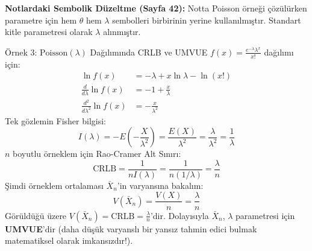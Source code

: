 \documentclass[12pt,a4paper]{article}
\begin{document}
\begin{uyari}
\textbf{Notlardaki Sembolik Düzeltme (Sayfa 42):}
Notta Poisson örneği çözülürken parametre için hem $\theta$ hem $\lambda$ sembolleri birbirinin yerine kullanılmıştır. Standart kitle parametresi olarak $\lambda$ alınmıştır.
\end{uyari}

\begin{ornek}{Örnek 3: $\text{Poisson}(\lambda)$ Dağılımında CRLB ve UMVUE}
$f(x) = \frac{e^{-\lambda}\lambda^x}{x!}$ dağılımı için:
\begin{align}
    \ln f(x) &= -\lambda + x \ln\lambda - \ln(x!) \\
    \frac{d}{d\lambda} \ln f(x) &= -1 + \frac{x}{\lambda} \\
    \frac{d^2}{d\lambda^2} \ln f(x) &= -\frac{x}{\lambda^2}
\end{align}
Tek gözlemin Fisher bilgisi:
\begin{equation}
    I(\lambda) = -E\left( -\frac{X}{\lambda^2} \right) = \frac{E(X)}{\lambda^2} = \frac{\lambda}{\lambda^2} = \frac{1}{\lambda}
\end{equation}
$n$ boyutlu örneklem için Rao-Cramer Alt Sınırı:
\begin{equation}
    \text{CRLB} = \frac{1}{n I(\lambda)} = \frac{1}{n (1/\lambda)} = \frac{\lambda}{n}
\end{equation}
Şimdi örneklem ortalaması $\bar{X}_n$'in varyansına bakalım:
\begin{equation}
    V(\bar{X}_n) = \frac{V(X)}{n} = \frac{\lambda}{n}
\end{equation}
Görüldüğü üzere $V(\bar{X}_n) = \text{CRLB} = \frac{\lambda}{n}$'dir.  
Dolayısıyla $\bar{X}_n$, $\lambda$ parametresi için \textbf{UMVUE}'dir (daha düşük varyanslı bir yansız tahmin edici bulmak matematiksel olarak imkansızdır!).
\end{ornek}

\begin{center}
\end{center}
\end{document}
